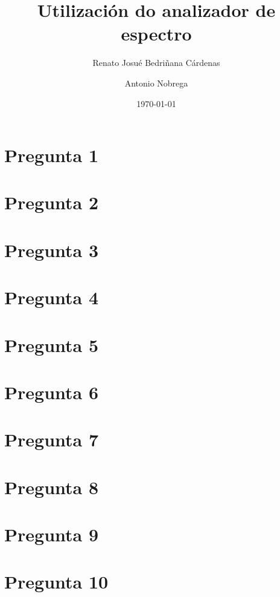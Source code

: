 \documentclass[11pt,a4paper]{article}
\title{\vspace{-1.5cm}\Large\textbf{Utilización do analizador de espectro}}
\author{\normalsize Renato Josué Bedriñana Cárdenas \and \normalsize Antonio Nobrega}
\date{\normalsize\today}
\begin{document}
\maketitle
\vspace{0.5cm}
\section{Pregunta 1}


\vspace{0.5cm}
\section{Pregunta 2}


\vspace{0.5cm}
\section{Pregunta 3}

\vspace{0.5cm}
\section{Pregunta 4}


\vspace{0.5cm}
\section{Pregunta 5}


\vspace{0.5cm}
\section{Pregunta 6}


\vspace{0.5cm}
\section{Pregunta 7}


\vspace{0.5cm}
\section{Pregunta 8}


\vspace{0.5cm}
\section{Pregunta 9}


\vspace{0.5cm}
\section{Pregunta 10}


\newpage
%
\end{document}
